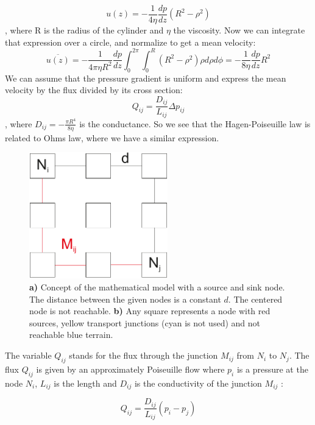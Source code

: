 \documentclass[11pt]{scrartcl}
\begin{document}
\begin{equation}
u(z)=-\frac{1}{4\eta}\frac{dp}{dz}(R^2-\rho^2)
\end{equation}
, where R is the radius of the cylinder and $\eta$ the viscosity. Now we can integrate that expression over a circle, and normalize to get a mean velocity:
\begin{equation}
\overline{u(z)}=-\frac{1}{4\pi\eta R^2}\frac{dp}{dz}\int_{0}^{2\pi}\int_{0}^{R}{(R^2-\rho^2)}\rho d\rho d\phi=-\frac{1}{8\eta}\frac{dp}{dz}R^2
\end{equation}
We can assume that the pressure gradient is uniform and express the mean velocity by the flux divided by its cross section:
\begin{equation}
Q_{ij}=\frac{D_{ij}}{L_{ij}}\Delta p_{ij}
\end{equation}
, where $D_{ij}=-\frac{\pi R^4}{8\eta}$ is the conductance. So we see that the Hagen-Poiseuille law is related to Ohms law, where we have a similar expression.
\begin{figure}[H]
	\centering
	\includegraphics[width=6cm]{figures/figure1}
	\caption{\textbf{a)} Concept of the mathematical model with a source and sink node. The distance between the given nodes is a constant $d$. The centered node is not reachable. \textbf{b)} Any square represents a node with red sources, yellow transport junctions (cyan is not used) and not reachable blue terrain.}
	\label{fig:schema}
\end{figure}

The variable $Q_{ij}$ stands for the flux through the junction $M_{ij}$ from $N_i$ to $N_j$. The flux $Q_{ij}$ is given by an approximately Poiseuille flow where $p_i$ is a pressure at the node $N_i$, $L_{ij}$ is the length and $D_{ij}$ is the conductivity of the junction $M_{ij}$ :

\begin{equation}
	\label{eq:1}
	Q_{ij}=\frac{D_{ij}}{L_{ij}}\left(p_i-p_j\right)
\end{equation}
\end{document}
